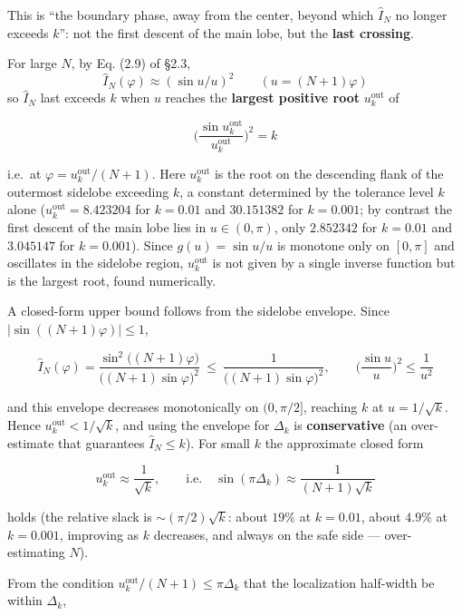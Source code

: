 \documentclass[
]{ltjsarticle}
\begin{document}
This is ``the boundary phase, away from the center, beyond which
\(\widehat{I}_N\) no longer exceeds \(k\)'': not the first descent of
the main lobe, but the \textbf{last crossing}.

For large \(N\), by Eq. (2.9) of §2.3,
\[\widehat{I}_N(\varphi)\approx(\sin u/u)^2\qquad(u=(N+1)\varphi)\] so
\(\widehat{I}_N\) last exceeds \(k\) when \(u\) reaches the
\textbf{largest positive root} \(u_k^{\mathrm{out}}\) of

\[
\Big(\frac{\sin u_k^{\mathrm{out}}}{u_k^{\mathrm{out}}}\Big)^2=k
\tag{2.11}
\]

i.e.~at \(\varphi=u_k^{\mathrm{out}}/(N+1)\). Here
\(u_k^{\mathrm{out}}\) is the root on the descending flank of the
outermost sidelobe exceeding \(k\), a constant determined by the
tolerance level \(k\) alone (\(u_k^{\mathrm{out}}=8.423204\) for
\(k=0.01\) and \(30.151382\) for \(k=0.001\); by contrast the first
descent of the main lobe lies in \(u\in(0,\pi)\), only \(2.852342\) for
\(k=0.01\) and \(3.045147\) for \(k=0.001\)). Since \(g(u)=\sin u/u\) is
monotone only on \([0,\pi]\) and oscillates in the sidelobe region,
\(u_k^{\mathrm{out}}\) is not given by a single inverse function but is
the largest root, found numerically.

A closed-form upper bound follows from the sidelobe envelope. Since
\(|\sin((N+1)\varphi)|\le1\),

\[
\widehat{I}_N(\varphi)=\frac{\sin^2\!\big((N+1)\varphi\big)}{\big((N+1)\sin\varphi\big)^2}
\ \le\ \frac{1}{\big((N+1)\sin\varphi\big)^2},
\qquad
\Big(\frac{\sin u}{u}\Big)^2\le\frac{1}{u^2}
\tag{2.12}
\]

and this envelope decreases monotonically on \((0,\pi/2]\), reaching
\(k\) at \(u=1/\sqrt{k}\). Hence \(u_k^{\mathrm{out}}<1/\sqrt{k}\), and
using the envelope for \(\Delta_k\) is \textbf{conservative} (an
over-estimate that guarantees \(\widehat{I}_N\le k\)). For small \(k\)
the approximate closed form

\[
u_k^{\mathrm{out}}\approx\frac{1}{\sqrt{k}},\qquad\text{i.e.}\quad
\sin(\pi\Delta_k)\approx\frac{1}{(N+1)\sqrt{k}}
\tag{2.13}
\]

holds (the relative slack is \(\sim(\pi/2)\sqrt{k}\): about \(19\%\) at
\(k=0.01\), about \(4.9\%\) at \(k=0.001\), improving as \(k\)
decreases, and always on the safe side --- over-estimating \(N\)).

From the condition \(u_k^{\mathrm{out}}/(N+1)\le \pi\Delta_k\) that the
localization half-width be within \(\Delta_k\),
\end{document}
